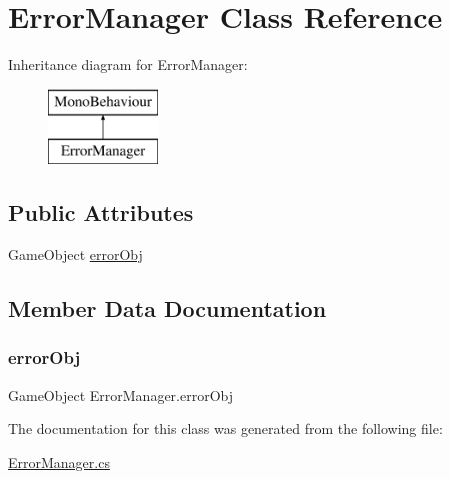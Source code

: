 \hypertarget{class_error_manager}{}\section{Error\+Manager Class Reference}
\label{class_error_manager}
Inheritance diagram for Error\+Manager\+:\begin{figure}[H]
\begin{center}
\leavevmode
\includegraphics[height=2.000000cm]{class_error_manager}
\end{center}
\end{figure}
\subsection*{Public Attributes}
\begin{DoxyCompactItemize}
\item 
Game\+Object \mbox{\hyperlink{class_error_manager_af503072edfca5b93a809467d35e37677}{error\+Obj}}
\end{DoxyCompactItemize}


\subsection{Member Data Documentation}
\mbox{\label{class_error_manager_af503072edfca5b93a809467d35e37677}} 
\subsubsection{\texorpdfstring{error\+Obj}{errorObj}}
{\footnotesize\ttfamily Game\+Object Error\+Manager.\+error\+Obj}



The documentation for this class was generated from the following file\+:\begin{DoxyCompactItemize}
\item 
\mbox{\hyperlink{_error_manager_8cs}{Error\+Manager.\+cs}}\end{DoxyCompactItemize}
